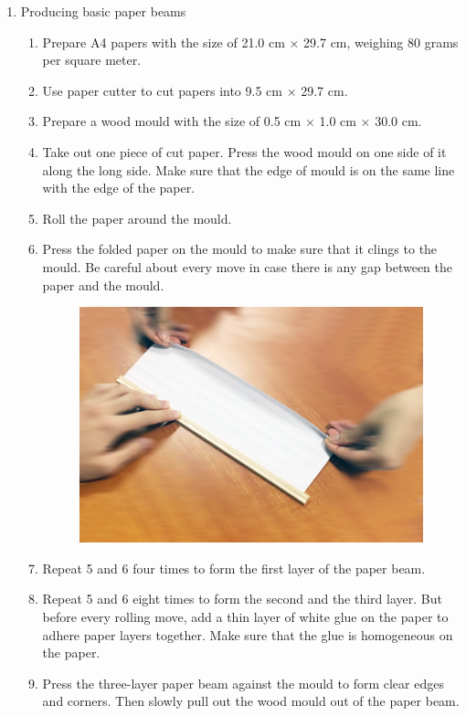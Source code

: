 \begin{enumerate}
\item Producing basic paper beams
	\begin{enumerate}
	\item Prepare A4 papers with the size of 21.0 cm $\times$ 29.7 cm, weighing 80 grams per square meter.
	\item Use paper cutter to cut papers into 9.5 cm $\times$ 29.7 cm.
	\item Prepare a wood mould with the size of 0.5 cm $\times$ 1.0 cm $\times$ 30.0 cm.
	\item Take out one piece of cut paper. Press the wood mould on one side of it along the long side. Make sure that the edge of mould is on the same line with the edge of the paper.
	\item Roll the paper around the mould. 
	\item Press the folded paper on the mould to make sure that it clings to the mould. Be careful about every move in case there is any gap between the paper and the mould.  
	\begin{figure}[H]
	\begin{center}
	\includegraphics[width=10cm]{figure/procedureJuanzhi/p1}
	\end{center}
	\end{figure}
	\item Repeat 5 and 6 four times to form the first layer of the paper beam.
	\item Repeat 5 and 6 eight times to form the second and the third layer. But before every rolling move, add a thin layer of white glue on the paper to adhere paper layers together. Make sure that the glue is homogeneous on the paper.
	\item Press the three-layer paper beam against the mould to form clear edges and corners. Then slowly pull out the wood mould out of the paper beam.

\end{enumerate}
\end{enumerate}

